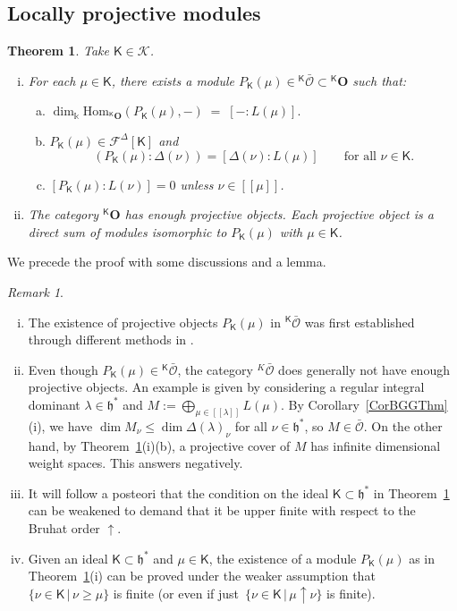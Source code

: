 \documentclass[11pt]{amsart}
\newcommand{\lbra}{[\![}
\newcommand{\rbra}{]\!]}
\newcommand{\cK}{\mathcal{K}}
\newcommand{\KKK}{\mathsf{K}}
\newcommand{\cF}{{\mathcal{F}}}
\newcommand{\cO}{\mathcal O}
\newcommand{\bO}{\mathbf{O}}
\newcommand{\Hom}{\mathrm{Hom}}
\newcommand{\mk}{\Bbbk}
\newcommand{\fh}{\mathfrak{h}}
\numberwithin{equation}{section}
\theoremstyle{plain}
\newtheorem{thm}[subsubsection]{Theorem}
\theoremstyle{remark}
\newtheorem{rem}[subsubsection]{Remark}
\theoremstyle{remark}
\theoremstyle{construction}
\begin{document}
\subsection{Locally projective modules} \label{SecConstProj}
\begin{thm}\label{ThmProj} Take $\KKK\in\cK$.
\begin{enumerate}[(i)]
\item For each $\mu\in\KKK$, there exists a module $P_{\KKK}(\mu)\in{}^{\KKK}\bar{\cO}\subset {}^{\KKK}\bO$ such that:
\begin{enumerate}[(a)]
\item $\dim_{\mk}\Hom_{{}^{\KKK}\bO}(P_{\KKK}(\mu),-)\;=\;[-:L(\mu)].$
\item $P_{\KKK}(\mu)\in \cF^{\Delta}[\KKK]$ {and} 
$$(P_{\KKK}(\mu):\Delta(\nu))=
[\Delta(\nu):L(\mu)]\qquad\mbox{for all $\nu\in \KKK$}.$$
\item $[P_{\KKK}(\mu):L(\nu)]=0$ unless $\nu\in \lbra\mu\rbra$.
\end{enumerate}
\item The category ${}^{\KKK}\bO$ has enough projective objects. Each projective object is a direct sum of modules isomorphic to $P_{\KKK}(\mu)$ with $\mu\in\KKK$.
\end{enumerate}
\end{thm}

We precede the proof with some discussions and a lemma.

\begin{rem}\label{RemBruhat}${}$
\begin{enumerate}[(i)]
\item The existence of projective objects $P_{\KKK}(\mu)$ in ${}^{\KKK}\bar{\cO}$ was first established through different methods in \cite[Section~4]{Nam}.
\item Even though $P_{\KKK}(\mu)\in{}^{\KKK}\bar{\cO}$, {the category ${}^K\bar{\mathcal{O}}$} does generally not have {enough} projective objects. An example is given by considering a regular integral dominant $\lambda\in\fh^\ast$ and $M:=\bigoplus_{\mu\in\lbra\lambda\rbra}L(\mu)$. By Corollary~\ref{CorBGGThm}(i), we have $\dim M_\nu\le \dim\Delta(\lambda)_\nu$ for all $\nu\in\fh^\ast$, so $M\in \bar{\cO}$. On the other hand, by Theorem~\ref{ThmProj}(i)(b), a projective cover of $M$ has infinite dimensional weight spaces. This answers \cite[Open Question~4.15]{Nam} negatively.
\item It will follow {a posteori} that the condition on the ideal $\KKK\subset\fh^\ast$ in Theorem~\ref{ThmProj} can be weakened to demand that it be upper finite with respect to the Bruhat order $\uparrow$.
\item Given an ideal $\KKK\subset\fh^\ast$ and  $\mu\in\KKK$, the existence of a module $P_{\KKK}(\mu)$ as in Theorem~\ref{ThmProj}(i) can be proved under the weaker assumption that $\{\nu\in\KKK\,|\,\nu\ge \mu\}$ is finite (or even {if just}~$\{\nu\in\KKK\,|\, \mu\uparrow \nu\}$ is finite). %
\end{enumerate}
\end{rem}
\end{document}
